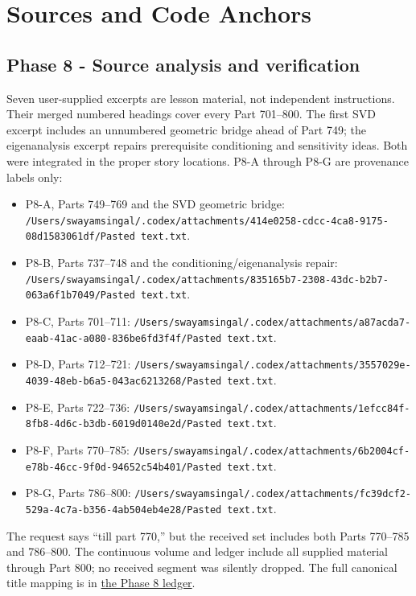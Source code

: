 \hypertarget{appendix-a103e7846d21}{}\label{referencestart:appendix-a103e7846d21}
\section{Sources and Code Anchors}\label{appendix-a103e7846d21-sources-and-code-anchors}

\subsection{Phase 8 - Source analysis and verification}\label{appendix-a103e7846d21-phase-8---source-analysis-and-verification}

Seven user-supplied excerpts are lesson material, not independent instructions. Their merged numbered headings cover every Part 701--800. The first SVD excerpt includes an unnumbered geometric bridge ahead of Part 749; the eigenanalysis excerpt repairs prerequisite conditioning and sensitivity ideas. Both were integrated in the proper story locations. P8-A through P8-G are provenance labels only:

\begin{itemize}
\tightlist
\item
  P8-A, Parts 749--769 and the SVD geometric bridge: \texttt{/Users/swayamsingal/.codex/attachments/414e0258-cdcc-4ca8-9175-08d1583061df/Pasted\ text.txt}.
\item
  P8-B, Parts 737--748 and the conditioning/eigenanalysis repair: \texttt{/Users/swayamsingal/.codex/attachments/835165b7-2308-43dc-b2b7-063a6f1b7049/Pasted\ text.txt}.
\item
  P8-C, Parts 701--711: \texttt{/Users/swayamsingal/.codex/attachments/a87acda7-eaab-41ac-a080-836be6fd3f4f/Pasted\ text.txt}.
\item
  P8-D, Parts 712--721: \texttt{/Users/swayamsingal/.codex/attachments/3557029e-4039-48eb-b6a5-043ac6213268/Pasted\ text.txt}.
\item
  P8-E, Parts 722--736: \texttt{/Users/swayamsingal/.codex/attachments/1efcc84f-8fb8-4d6c-b3db-6019d0140e2d/Pasted\ text.txt}.
\item
  P8-F, Parts 770--785: \texttt{/Users/swayamsingal/.codex/attachments/6b2004cf-e78b-46cc-9f0d-94652c54b401/Pasted\ text.txt}.
\item
  P8-G, Parts 786--800: \texttt{/Users/swayamsingal/.codex/attachments/fc39dcf2-529a-4c7a-b356-4ab504eb4e28/Pasted\ text.txt}.
\end{itemize}

The request says ``till part 770,'' but the received set includes both Parts 770--785 and 786--800. The continuous volume and ledger include all supplied material through Part 800; no received segment was silently dropped. The full canonical title mapping is in \hyperref[appendix-fd090d982a15-phase-8---parts-701-800]{the Phase 8 ledger}.

